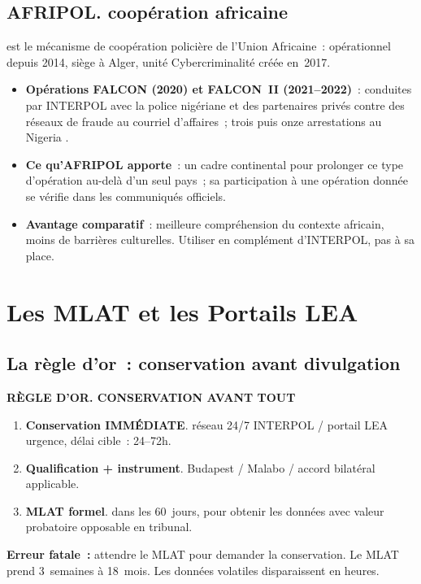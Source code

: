 \subsection{AFRIPOL. coopération africaine}

 est le mécanisme de coopération policière
de l'Union Africaine~: opérationnel depuis 2014, siège à Alger, unité
Cybercriminalité créée en~2017.

\begin{itemize}
    \item \textbf{Opérations FALCON (2020) et FALCON~II (2021--2022)}~:
          conduites par INTERPOL avec la police nigériane et des
          partenaires privés contre des réseaux de fraude au courriel
          d'affaires~; trois puis onze arrestations au Nigeria
          \cite{interpol2020falcon,interpol2022falcon}.
    \item \textbf{Ce qu'AFRIPOL apporte}~: un cadre continental pour
          prolonger ce type d'opération au-delà d'un seul pays~; sa
          participation à une opération donnée se vérifie dans les
          communiqués officiels.
    \item \textbf{Avantage comparatif}~: meilleure compréhension du
          contexte africain, moins de barrières culturelles. Utiliser
          en complément d'INTERPOL, pas à sa place.
\end{itemize}

\section{Les MLAT et les Portails LEA}
\label{sec:mlat-lea}

\subsection{La règle d'or~: conservation avant divulgation}

\begin{boxalert}
\textbf{RÈGLE D'OR. CONSERVATION AVANT TOUT}
\begin{enumerate}
    \item \textbf{Conservation IMMÉDIATE}. réseau 24/7 INTERPOL /
          portail LEA urgence, délai cible~: 24--72h.
    \item \textbf{Qualification + instrument}. Budapest / Malabo /
          accord bilatéral applicable.
    \item \textbf{MLAT formel}. dans les 60~jours, pour obtenir
          les données avec valeur probatoire opposable en tribunal.
\end{enumerate}
\textbf{Erreur fatale~:} attendre le MLAT pour demander la conservation.
Le MLAT prend 3~semaines à 18~mois. Les données volatiles disparaissent
en heures.
\end{boxalert}

